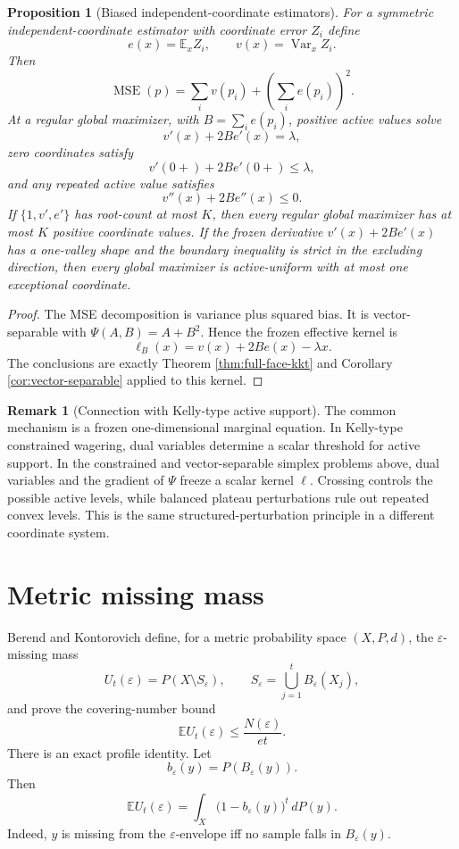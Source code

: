 \documentclass[11pt]{article}
\newtheorem{proposition}[theorem]{Proposition}
\theoremstyle{definition}
\newtheorem{remark}[theorem]{Remark}
\newcommand{\E}{\mathbb E}
\begin{document}
\begin{proposition}[Biased independent-coordinate estimators]
For a symmetric independent-coordinate estimator with coordinate error $Z_i$ define
\[
  e(x)=\E_x Z_i,
  \qquad
  v(x)=\operatorname{Var}_x Z_i.
\]
Then
\[
  \operatorname{MSE}(p)=\sum_i v(p_i)+\left(\sum_i e(p_i)\right)^2.
\]
At a regular global maximizer, with $B=\sum_i e(p_i)$, positive active values solve
\[
  v'(x)+2B e'(x)=\lambda,
\]
zero coordinates satisfy
\[
  v'(0+)+2B e'(0+)\le \lambda,
\]
and any repeated active value satisfies
\[
  v''(x)+2B e''(x)\le0.
\]
If $\{1,v',e'\}$ has root-count at most $K$, then every regular global maximizer has at most $K$ positive coordinate values.  If the frozen derivative $v'(x)+2B e'(x)$ has a one-valley shape and the boundary inequality is strict in the excluding direction, then every global maximizer is active-uniform with at most one exceptional coordinate.
\end{proposition}

\begin{proof}
The MSE decomposition is variance plus squared bias.  It is vector-separable with $\Psi(A,B)=A+B^2$.  Hence the frozen effective kernel is
\[
  \ell_B(x)=v(x)+2B e(x)-\lambda x.
\]
The conclusions are exactly Theorem \ref{thm:full-face-kkt} and Corollary \ref{cor:vector-separable} applied to this kernel.
\end{proof}


\begin{remark}[Connection with Kelly-type active support]
The common mechanism is a frozen one-dimensional marginal equation.  In Kelly-type constrained wagering, dual variables determine a scalar threshold for active support.  In the constrained and vector-separable simplex problems above, dual variables and the gradient of $\Psi$ freeze a scalar kernel $\ell$.  Crossing controls the possible active levels, while balanced plateau perturbations rule out repeated convex levels.  This is the same structured-perturbation principle in a different coordinate system.
\end{remark}


\section{Metric missing mass}

Berend and Kontorovich define, for a metric probability space $(X,P,d)$, the $\varepsilon$-missing mass
\[
  U_t(\varepsilon)=P(X\setminus S_\varepsilon),
  \qquad S_\varepsilon=\bigcup_{j=1}^t B_\varepsilon(X_j),
\]
and prove the covering-number bound
\[
  \E U_t(\varepsilon)\le \frac{N(\varepsilon)}{et}.
\]
There is an exact profile identity. Let
\[
  b_\varepsilon(y)=P(B_\varepsilon(y)).
\]
Then
\[
  \E U_t(\varepsilon)=\int_X \bigl(1-b_\varepsilon(y)\bigr)^t\,dP(y).
\]
Indeed, $y$ is missing from the $\varepsilon$-envelope iff no sample falls in $B_\varepsilon(y)$.
\end{document}
